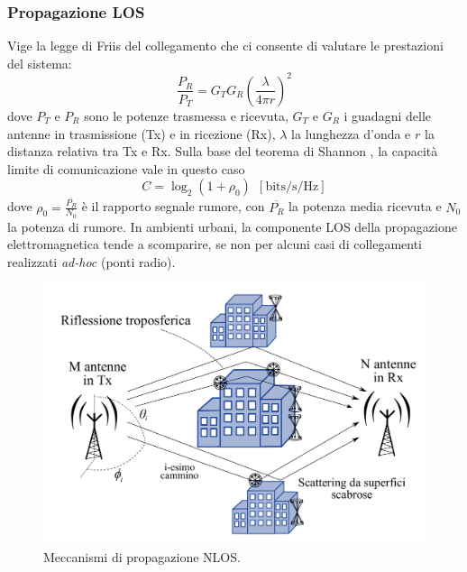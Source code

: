 \documentclass[technote]{IEEEtran}
\begin{document}
\subsubsection{Propagazione LOS} Vige la legge di Friis del collegamento \cite{Friis} che ci consente di valutare le prestazioni del sistema: $$\frac{P_R}{P_T} = G_T G_R \left ( \frac{\lambda}{4\pi r} \right )^2$$ dove $P_T$ e $P_R$ sono le potenze trasmessa e ricevuta, $G_T$ e $G_R$ i guadagni delle antenne in trasmissione (Tx) e in ricezione (Rx), $\lambda$ la lunghezza d'onda e $r$ la distanza relativa tra Tx e Rx. Sulla base del teorema di Shannon \cite{Shannon1948}, la capacità limite di comunicazione vale in questo caso  $$ C = \log_2(1+\rho_{0}) \ \ \mathrm{[bits/s/Hz]}$$ dove $\rho_0 = \frac{\overline{P_R}}{N_0}$ è il rapporto segnale rumore, con $\overline{P_R}$ la potenza media ricevuta e $N_0$ la potenza di rumore. In ambienti urbani, la componente LOS della propagazione elettromagnetica tende a scomparire, se non per alcuni casi di collegamenti realizzati \textit{ad-hoc} (ponti radio).
\begin{figure}[!ht]
\centering
\includegraphics[width=\columnwidth]{figure2}
\caption{Meccanismi di propagazione NLOS.}
\label{fig:2}
\end{figure}
\end{document}
